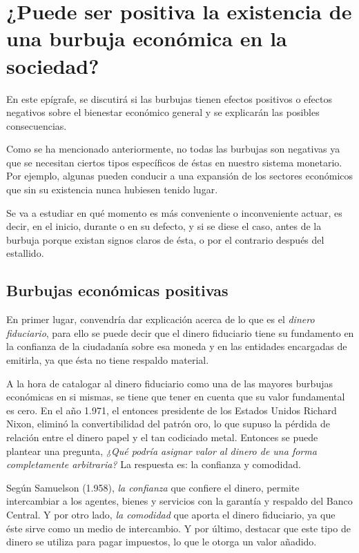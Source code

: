 \section{¿Puede ser positiva la existencia de una burbuja económica en la sociedad?} 
En este epígrafe, se discutirá si las burbujas tienen efectos positivos o efectos negativos sobre el bienestar económico general y se explicarán las posibles consecuencias. 

Como se ha mencionado anteriormente, no todas las burbujas son negativas ya que se necesitan ciertos tipos específicos de éstas en nuestro sistema monetario. Por ejemplo, algunas pueden conducir a una expansión de los sectores económicos que sin su existencia nunca hubiesen tenido lugar. 

Se va a estudiar en qué momento es más conveniente o inconveniente actuar, es decir, en el inicio, durante o en su defecto, y si se diese el caso, antes de la burbuja porque existan signos claros de ésta, o por el contrario después del estallido.

\subsection{Burbujas económicas positivas}

En primer lugar, convendría dar explicación acerca de lo que es el \emph{dinero fiduciario}, para ello se puede decir que el dinero fiduciario tiene su fundamento en la confianza de la ciudadanía sobre esa moneda y en las entidades encargadas de emitirla, ya que ésta no tiene respaldo material.

A la hora de catalogar al dinero fiduciario como una de las mayores burbujas económicas en si mismas, se tiene que tener en cuenta que su valor fundamental es cero. En el año 1.971, el entonces presidente de los Estados Unidos Richard Nixon, eliminó la convertibilidad del patrón oro, lo que supuso la pérdida de relación entre el dinero papel y el tan codiciado metal. Entonces se puede plantear una pregunta, \emph{¿Qué podría asignar valor al dinero de una forma completamente arbitraria?} La respuesta es: la confianza y comodidad. 

Según Samuelson (1.958), \emph{la confianza} que confiere el dinero, permite intercambiar a los agentes, bienes y servicios con la garantía y respaldo del Banco Central. Y por otro lado, \emph{la comodidad} que aporta el dinero fiduciario, ya que éste sirve como un medio de intercambio. Y por último, destacar que este tipo de dinero se utiliza para pagar  impuestos, lo que le otorga un valor añadido.

